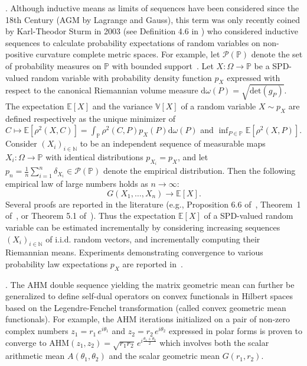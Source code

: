 \documentclass{article}
\def\domega{{\mathrm{d}\omega}}
\def\calP{\mathcal{P}}
\def\det{\mathrm{det}}
\def\AHM{\mathrm{AHM}}
\def\bbP{\mathbb{P}}
\def\bbN{\mathbb{N}}
\def\bbE{\mathbb{E}}
\def\bbV{\mathbb{V}}
\begin{document}
\vskip 0.3cm
.
Although inductive means as limits of sequences have been considered since the 18th Century (AGM by Lagrange and Gauss), 
this term was only recently coined by Karl-Theodor Sturm in 2003 (see Definition 4.6 in \cite{sturm2003probability}) who considered inductive sequences to calculate probability expectations of random variables on non-positive curvature complete metric spaces.
For example, let $\calP(\bbP)$ denote the set of probability measures on $\bbP$ with bounded support~\cite{sturm2003probability}.
Let $X:\Omega\rightarrow\bbP$ be a SPD-valued random variable with probability density function $p_X$ expressed with respect to the 
canonical Riemannian volume measure $\domega(P)=\sqrt{\det(g_P)}$.
The expectation $\bbE[X]$ and the variance $\bbV[X]$ of a random variable $X\sim p_X$ are defined respectively as 
the unique minimizer of $C\mapsto \bbE[\rho^2(X,C)]=\int_\bbP \rho^2(C,P)p_X(P)\domega(P)$ and $\inf_{P\in\bbP} \bbE[\rho^2(X,P)]$.
Consider $(X_i)_{i\in\bbN}$ to be an independent sequence of measurable maps $X_i:\Omega\rightarrow\bbP$ with identical distributions $p_{X_i}=p_X$, and let $p_n=\frac{1}{n}\sum_{i=1}^n \delta_{X_i}\in\calP(\bbP)$ denote the empirical distribution. 
Then the following empirical law of large numbers  holds as $n\rightarrow\infty$:
$$
G(X_1,\ldots,X_n)\rightarrow \bbE[X].
$$
Several proofs are reported in the literature (e.g., Proposition 6.6 of~\cite{sturm2003probability}, Theorem~1 of~\cite{RecursiveFrechetMeanNPC-2016}, or Theorem 5.1 of~\cite{bacak2014computing}).
Thus the expectation $\bbE[X]$ of a SPD-valued random variable can be estimated incrementally by 
considering increasing sequences $(X_i)_{i\in\bbN}$ of i.i.d. random vectors, and incrementally computing their Riemannian means.
Experiments demonstrating convergence to various probability law expectations $p_X$ are reported in~\cite{RecursiveFrechetMeanNPC-2016}.



\vskip 0.3cm
.
The AHM double sequence yielding the matrix geometric mean can further be generalized to define self-dual operators on convex functionals in Hilbert spaces~\cite{ConvexFunctionalMean-2001} based on 
the Legendre-Fenchel transformation  (called convex geometric mean functionals).
For example, the AHM iterations initialized on a pair of non-zero complex numbers 
$z_1=r_1\, e^{i\theta_1}$ and $z_2=r_2\, e^{i\theta_2}$ expressed in polar forms is proven to converge to $\AHM(z_1,z_2)=\sqrt{r_1r_2}\, e^{i\frac{\theta_1+\theta_2}{2}}$ which involves both the scalar arithmetic mean $A(\theta_1,\theta_2)$ and the scalar geometric mean $G(r_1,r_2)$.
\end{document}
